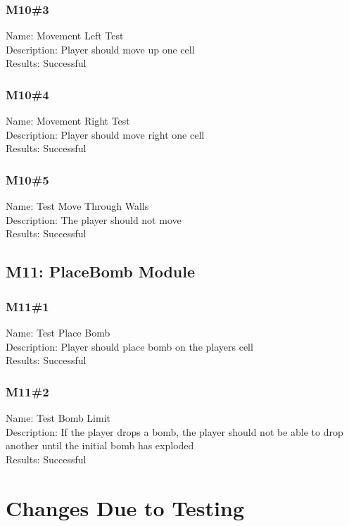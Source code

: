 \documentclass[12pt, titlepage]{article}
\begin{document}
    \subsubsection{M10\#3}
    Name: Movement Left Test\\
    Description: Player should move up one cell \\
    Results: Successful \\
    \subsubsection{M10\#4}
    Name: Movement Right Test\\
    Description: Player should move right one cell \\
    Results: Successful \\
    \subsubsection{M10\#5}
    Name: Test Move Through Walls\\
    Description: The player should not move  \\
    Results: Successful \\
    
    \subsection{M11: PlaceBomb Module}
    \subsubsection{M11\#1}
    Name: Test Place Bomb\\
    Description: Player should place bomb on the players cell\\
    Results: Successful \\
    
    \subsubsection{M11\#2}
    Name: Test Bomb Limit\\
    Description: If the player drops a bomb, the player should not be able to drop another until the initial bomb has exploded\\
    Results: Successful \\
    

\section{Changes Due to Testing}
\end{document}
